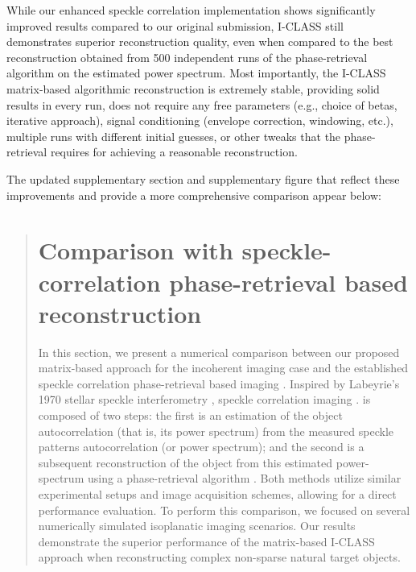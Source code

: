 \documentclass[12pt]{article}
\newenvironment{finished_ourresponse}
    {\begin{tcolorbox}[width=\linewidth,breakable,enhanced,colback=gray!5,colframe=finished_responsecolor!50,title=Response,left=5pt,right=5pt]}
    {\end{tcolorbox}}
\begin{document}
\begin{finished_ourresponse}
    While our enhanced speckle correlation implementation shows significantly improved results compared to our original submission, I-CLASS still demonstrates superior reconstruction quality, even when compared to the best reconstruction obtained from 500 independent runs of the phase-retrieval algorithm on the estimated power spectrum. Most importantly, the I-CLASS matrix-based algorithmic reconstruction is extremely stable, providing solid results in every run, does not require any free parameters (e.g., choice of betas, iterative approach), signal conditioning (envelope correction, windowing, etc.), multiple runs with different initial guesses, or other tweaks that the phase-retrieval requires for achieving a reasonable reconstruction. 
    
     The updated supplementary section and supplementary figure that reflect these improvements and provide a more comprehensive comparison appear below:

    \begin{quote}
        \setcounter{section}{291}
        \section{Comparison with speckle-correlation phase-retrieval based reconstruction}

        In this section, we present a numerical comparison between our proposed matrix-based approach for the incoherent imaging case and the established speckle correlation phase-retrieval based imaging  \cite{bert12, katz14}. Inspired by Labeyrie's 1970 stellar speckle interferometry \cite{labeyrie1970attainment}, speckle correlation imaging \cite{bert12, katz14}. is composed of two steps: the first is an estimation of the object autocorrelation (that is, its power spectrum) from the measured speckle patterns autocorrelation (or power spectrum); and the second is a subsequent reconstruction of the object from this estimated power-spectrum using a phase-retrieval algorithm \cite{fienup1982phase}. 
        Both methods utilize similar experimental setups and image acquisition schemes, allowing for a direct performance evaluation. To perform this comparison, we focused on several numerically simulated isoplanatic imaging scenarios. Our results demonstrate the superior performance of the matrix-based I-CLASS approach when reconstructing complex non-sparse natural target objects. 
        

\end{quote}
\end{finished_ourresponse}
\end{document}
